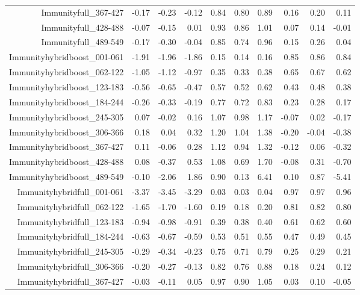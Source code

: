 \begin{table}[ht]
\begin{tabular}{rrrrrrrrrr}
  Immunityfull\_367-427 & -0.17 & -0.23 & -0.12 & 0.84 & 0.80 & 0.89 & 0.16 & 0.20 & 0.11 \\ 
  Immunityfull\_428-488 & -0.07 & -0.15 & 0.01 & 0.93 & 0.86 & 1.01 & 0.07 & 0.14 & -0.01 \\ 
  Immunityfull\_489-549 & -0.17 & -0.30 & -0.04 & 0.85 & 0.74 & 0.96 & 0.15 & 0.26 & 0.04 \\ 
  Immunityhybridboost\_001-061 & -1.91 & -1.96 & -1.86 & 0.15 & 0.14 & 0.16 & 0.85 & 0.86 & 0.84 \\ 
  Immunityhybridboost\_062-122 & -1.05 & -1.12 & -0.97 & 0.35 & 0.33 & 0.38 & 0.65 & 0.67 & 0.62 \\ 
  Immunityhybridboost\_123-183 & -0.56 & -0.65 & -0.47 & 0.57 & 0.52 & 0.62 & 0.43 & 0.48 & 0.38 \\ 
  Immunityhybridboost\_184-244 & -0.26 & -0.33 & -0.19 & 0.77 & 0.72 & 0.83 & 0.23 & 0.28 & 0.17 \\ 
  Immunityhybridboost\_245-305 & 0.07 & -0.02 & 0.16 & 1.07 & 0.98 & 1.17 & -0.07 & 0.02 & -0.17 \\ 
  Immunityhybridboost\_306-366 & 0.18 & 0.04 & 0.32 & 1.20 & 1.04 & 1.38 & -0.20 & -0.04 & -0.38 \\ 
  Immunityhybridboost\_367-427 & 0.11 & -0.06 & 0.28 & 1.12 & 0.94 & 1.32 & -0.12 & 0.06 & -0.32 \\ 
  Immunityhybridboost\_428-488 & 0.08 & -0.37 & 0.53 & 1.08 & 0.69 & 1.70 & -0.08 & 0.31 & -0.70 \\ 
  Immunityhybridboost\_489-549 & -0.10 & -2.06 & 1.86 & 0.90 & 0.13 & 6.41 & 0.10 & 0.87 & -5.41 \\ 
  Immunityhybridfull\_001-061 & -3.37 & -3.45 & -3.29 & 0.03 & 0.03 & 0.04 & 0.97 & 0.97 & 0.96 \\ 
  Immunityhybridfull\_062-122 & -1.65 & -1.70 & -1.60 & 0.19 & 0.18 & 0.20 & 0.81 & 0.82 & 0.80 \\ 
  Immunityhybridfull\_123-183 & -0.94 & -0.98 & -0.91 & 0.39 & 0.38 & 0.40 & 0.61 & 0.62 & 0.60 \\ 
  Immunityhybridfull\_184-244 & -0.63 & -0.67 & -0.59 & 0.53 & 0.51 & 0.55 & 0.47 & 0.49 & 0.45 \\ 
  Immunityhybridfull\_245-305 & -0.29 & -0.34 & -0.23 & 0.75 & 0.71 & 0.79 & 0.25 & 0.29 & 0.21 \\ 
  Immunityhybridfull\_306-366 & -0.20 & -0.27 & -0.13 & 0.82 & 0.76 & 0.88 & 0.18 & 0.24 & 0.12 \\ 
  Immunityhybridfull\_367-427 & -0.03 & -0.11 & 0.05 & 0.97 & 0.90 & 1.05 & 0.03 & 0.10 & -0.05 \\ 

\end{tabular}
\end{table}

